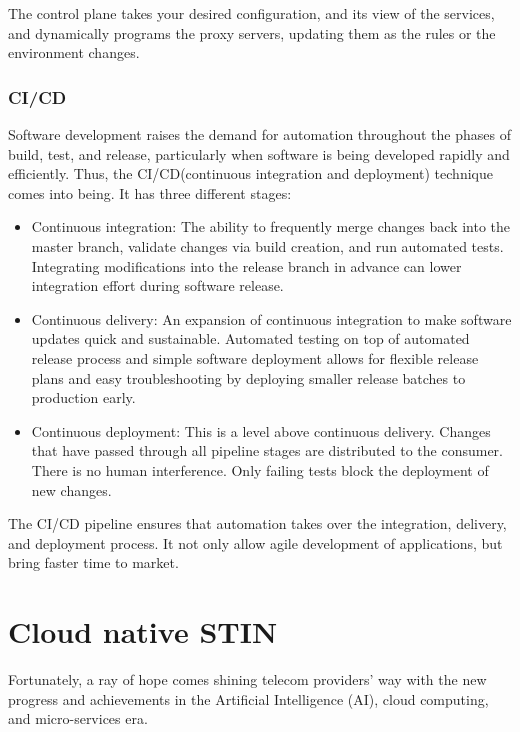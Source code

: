 \documentclass[12pt, draftclsnofoot, onecolumn]{IEEEtran}
\begin{document}
The control plane takes your desired configuration, and its view of the services, and dynamically programs the proxy servers, updating them as the rules or the environment changes.
 
\subsubsection{CI/CD}
Software development raises the demand for automation throughout the phases of build, test, and release, particularly when software is being developed rapidly and efficiently. Thus, the CI/CD(continuous integration and deployment) technique comes into being. It has three different stages:
\begin{itemize}
	\item Continuous integration: The ability to frequently merge changes back into the master branch, validate changes via build creation, and run automated tests. Integrating modifications into the release branch in advance can lower integration effort during software release.
	\item Continuous delivery: An expansion of continuous integration to make software updates quick and sustainable. Automated testing on top of automated release process and simple software deployment allows for flexible release plans and easy troubleshooting by deploying smaller release batches to production early.
	\item Continuous deployment: This is a level above continuous delivery. Changes that have passed through all pipeline stages are distributed to the consumer. There is no human interference. Only failing tests block the deployment of new changes.
\end{itemize}

The CI/CD pipeline ensures that automation takes over the integration, delivery, and deployment process. It not only allow agile development of applications, but bring faster time to market.

\section{Cloud native STIN}
Fortunately, a ray of hope comes shining telecom providers’ way with the new progress and achievements in the Artificial Intelligence (AI), cloud computing, and micro-services era. 
\end{document}
